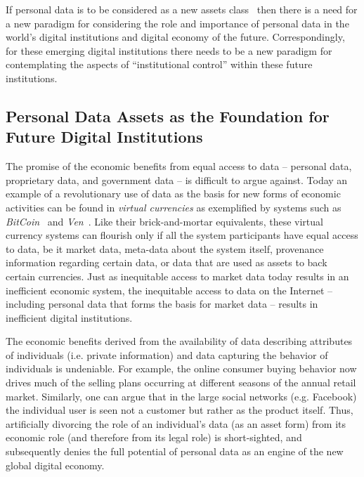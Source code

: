 If personal data is to be considered as
a new assets class~\cite{WEF2011}
then there is a need for a new paradigm for considering
the role and importance of personal data in 
the world's digital institutions and digital economy of the future.
Correspondingly, for these emerging digital institutions
there needs to be a new paradigm for contemplating
the aspects of ``institutional control'' within these
future institutions.






\subsection{Personal Data Assets as the Foundation for Future Digital Institutions}

The promise of the economic benefits from equal access to 
data -- personal data, proprietary data, and government data --
is difficult to argue against.
Today an example of a revolutionary use of data
as the basis for new forms of economic activities
can be found in {\em virtual currencies} as exemplified
by systems such as {\em BitCoin}~\cite{BarberBoyen2012} and
{\em Ven}~\cite{Stalnaker2013}.
Like their brick-and-mortar equivalents,
these virtual currency systems can flourish
only if all the system participants have equal access
to data, be it market data, meta-data about the system itself,
provenance information regarding certain data,
or data that are used as assets to back certain currencies.
Just as inequitable access to market data today results
in an inefficient economic system,
the inequitable access to data on the Internet
-- including personal data that forms the basis for market data --
results in inefficient digital institutions.

The economic benefits derived from the availability of data
describing attributes of individuals (i.e. private information)
and data capturing the behavior of individuals is undeniable.
For example, the online consumer buying behavior now drives much
of the selling plans occurring at different seasons
of the annual retail market.
Similarly, one can argue that in the large social networks (e.g. Facebook)
the individual user is seen not a customer but rather as the product itself.
Thus, artificially divorcing the role
of an individual's data (as an asset form) from its economic role
(and therefore from its legal role) is short-sighted,
and subsequently denies the full potential of personal data
as an engine of the new global digital economy.


